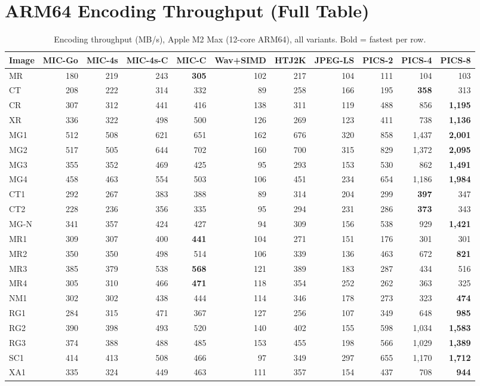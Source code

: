\documentclass[journal]{IEEEtran}
\begin{document}
\section{ARM64 Encoding Throughput (Full Table)}
\label{app:arm64-enc}

\begin{table}[htbp]
\centering
\caption{Encoding throughput (MB/s), Apple M2 Max (12-core ARM64), all
variants. Bold = fastest per row.}
\label{tab:enc-arm64-full}
\scriptsize
\begin{tabular}{lrrrrrrrrrr}
\toprule
Image & MIC-Go & MIC-4s & MIC-4s-C & MIC-C & Wav+SIMD & HTJ2K & JPEG-LS & PICS-2 & PICS-4 & PICS-8 \\
\midrule
MR  & 180 & 219 & 243 & \textbf{305} & 102 & 217 & 104 & 111 & 104 & 103 \\
CT  & 208 & 222 & 314 & 332 & 89 & 258 & 166 & 195 & \textbf{358} & 313 \\
CR  & 307 & 312 & 441 & 416 & 138 & 311 & 119 & 488 & 856 & \textbf{1,195} \\
XR  & 336 & 322 & 498 & 500 & 126 & 269 & 123 & 411 & 738 & \textbf{1,136} \\
MG1 & 512 & 508 & 621 & 651 & 162 & 676 & 320 & 858 & 1,437 & \textbf{2,001} \\
MG2 & 517 & 505 & 644 & 702 & 160 & 700 & 315 & 829 & 1,372 & \textbf{2,095} \\
MG3 & 355 & 352 & 469 & 425 & 95 & 293 & 153 & 530 & 862 & \textbf{1,491} \\
MG4 & 458 & 463 & 554 & 503 & 106 & 451 & 234 & 654 & 1,186 & \textbf{1,984} \\
CT1 & 292 & 267 & 383 & 388 & 89 & 314 & 204 & 299 & \textbf{397} & 347 \\
CT2 & 228 & 236 & 356 & 335 & 95 & 294 & 231 & 286 & \textbf{373} & 343 \\
MG-N & 341 & 357 & 424 & 427 & 94 & 309 & 156 & 538 & 929 & \textbf{1,421} \\
MR1 & 309 & 307 & 400 & \textbf{441} & 104 & 271 & 151 & 176 & 301 & 301 \\
MR2 & 350 & 350 & 498 & 514 & 106 & 339 & 136 & 463 & 672 & \textbf{821} \\
MR3 & 385 & 379 & 538 & \textbf{568} & 121 & 389 & 183 & 287 & 434 & 516 \\
MR4 & 305 & 310 & 466 & \textbf{471} & 118 & 354 & 252 & 262 & 363 & 325 \\
NM1 & 302 & 302 & 438 & 444 & 114 & 346 & 178 & 273 & 323 & \textbf{474} \\
RG1 & 284 & 315 & 471 & 367 & 127 & 256 & 107 & 349 & 648 & \textbf{985} \\
RG2 & 390 & 398 & 493 & 520 & 140 & 402 & 155 & 598 & 1,034 & \textbf{1,583} \\
RG3 & 374 & 388 & 488 & 485 & 153 & 455 & 198 & 566 & 1,029 & \textbf{1,389} \\
SC1 & 414 & 413 & 508 & 466 & 97 & 349 & 297 & 655 & 1,170 & \textbf{1,712} \\
XA1 & 335 & 324 & 449 & 463 & 111 & 357 & 154 & 437 & 708 & \textbf{944} \\
\bottomrule
\end{tabular}
\end{table}
\end{document}
